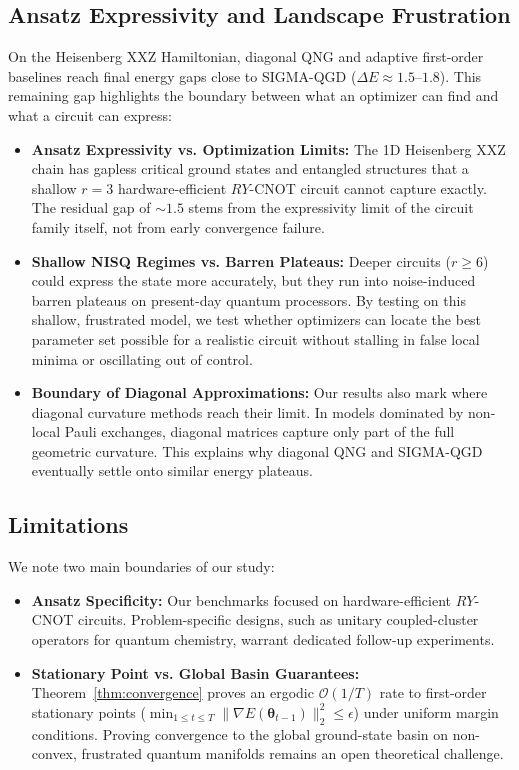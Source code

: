 \documentclass[11pt,a4paper]{article}
\begin{document}
\subsection{Ansatz Expressivity and Landscape Frustration}
On the Heisenberg XXZ Hamiltonian, diagonal QNG and adaptive first-order baselines reach final energy gaps close to SIGMA-QGD ($\Delta E \approx 1.5\text{--}1.8$). This remaining gap highlights the boundary between what an optimizer can find and what a circuit can express:
\begin{itemize}
    \item \textbf{Ansatz Expressivity vs. Optimization Limits:} The 1D Heisenberg XXZ chain has gapless critical ground states and entangled structures that a shallow $r=3$ hardware-efficient $RY$-CNOT circuit cannot capture exactly. The residual gap of $\sim 1.5$ stems from the expressivity limit of the circuit family itself, not from early convergence failure.
    \item \textbf{Shallow NISQ Regimes vs. Barren Plateaus:} Deeper circuits ($r \ge 6$) could express the state more accurately, but they run into noise-induced barren plateaus on present-day quantum processors. By testing on this shallow, frustrated model, we test whether optimizers can locate the best parameter set possible for a realistic circuit without stalling in false local minima or oscillating out of control.
    \item \textbf{Boundary of Diagonal Approximations:} Our results also mark where diagonal curvature methods reach their limit. In models dominated by non-local Pauli exchanges, diagonal matrices capture only part of the full geometric curvature. This explains why diagonal QNG and SIGMA-QGD eventually settle onto similar energy plateaus.
\end{itemize}

\subsection{Limitations}
We note two main boundaries of our study:
\begin{itemize}
    \item \textbf{Ansatz Specificity:} Our benchmarks focused on hardware-efficient $RY$-CNOT circuits. Problem-specific designs, such as unitary coupled-cluster operators for quantum chemistry, warrant dedicated follow-up experiments.
    \item \textbf{Stationary Point vs. Global Basin Guarantees:} Theorem~\ref{thm:convergence} proves an ergodic $\mathcal{O}(1/T)$ rate to first-order stationary points ($\min_{1 \le t \le T} \|\nabla E(\boldsymbol{\theta}_{t-1})\|_2^2 \le \epsilon$) under uniform margin conditions. Proving convergence to the global ground-state basin on non-convex, frustrated quantum manifolds remains an open theoretical challenge.
\end{itemize}
\end{document}
